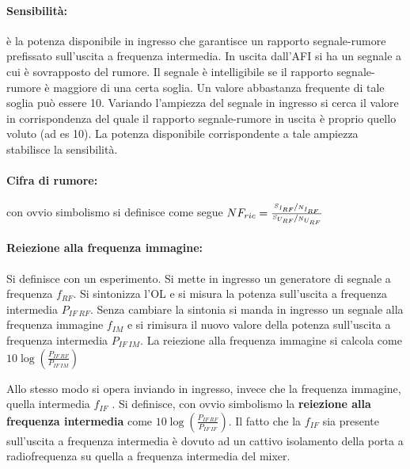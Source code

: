 \paragraph{Sensibilità:} è la potenza disponibile in ingresso che garantisce un rapporto segnale-rumore
prefissato sull'uscita a frequenza intermedia.
In uscita dall'AFI si ha un segnale a cui è sovrapposto del rumore. Il segnale è intelligibile se il
rapporto segnale-rumore è maggiore di una certa soglia. Un valore abbastanza frequente di tale
soglia può essere 10.
Variando l'ampiezza del segnale in ingresso si cerca il valore in corrispondenza del quale il
rapporto segnale-rumore in uscita è proprio quello voluto (ad es 10). La potenza disponibile
corrispondente a tale ampiezza stabilisce la sensibilità.

\paragraph{Cifra di rumore:} con ovvio simbolismo si definisce come segue $NF_{ric} = \frac{\nicefrac{S_{I_{RF}}}{N_{I_{RF}}}}{\nicefrac{S_{U_{RF}}}{N_{U_{RF}}}}$
\paragraph{Reiezione alla frequenza immagine:}
Si definisce con un esperimento. Si mette in ingresso un generatore di segnale a frequenza $f_{RF}$. Si
sintonizza l'OL e si misura la potenza sull'uscita a frequenza intermedia $P_{IF~RF}$. Senza cambiare la
sintonia si manda in ingresso un segnale alla frequenza immagine $f_{IM}$ e si rimisura il nuovo valore
della potenza sull'uscita a frequenza intermedia $P_{IF~IM}$. La reiezione alla frequenza immagine si calcola come $10\log\left(\frac{P_{IF~RF}}{P_{IF~IM}}\right)$

Allo stesso modo si opera inviando in ingresso, invece che la frequenza immagine, quella intermedia $f_{IF}$ . Si definisce, con ovvio simbolismo la \textbf{reiezione alla frequenza intermedia} come $10\log\left(\frac{P_{IF~RF}}{P_{IF~IF}}\right)$. Il fatto che la $f_{IF}$ sia presente sull'uscita a frequenza intermedia è dovuto ad un cattivo isolamento della porta a radiofrequenza su quella a frequenza intermedia del mixer.


